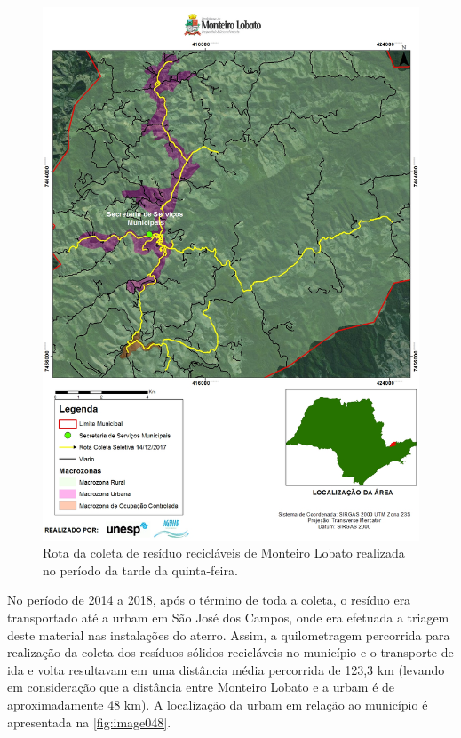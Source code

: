 \begin{figure}
	\centering
	\includegraphics[width=1\linewidth]{produtos/prodtres/image047}
	\caption{Rota da coleta de resíduo recicláveis de Monteiro Lobato realizada no período da tarde da quinta-feira.}
	\label{fig:image047}
\end{figure}


No período de 2014 a 2018, após o término de toda a coleta, o resíduo era transportado até a \gls{urbam} em São José dos Campos, onde era efetuada a triagem deste material nas instalações do aterro. Assim, a quilometragem percorrida para realização da coleta dos resíduos sólidos recicláveis no município e o transporte de ida e volta resultavam em uma distância média percorrida de 123,3 km (levando em consideração que a distância entre Monteiro Lobato e a \gls{urbam} é de aproximadamente 48 km). A localização da \gls{urbam} em relação ao município é apresentada na \autoref{fig:image048}.

